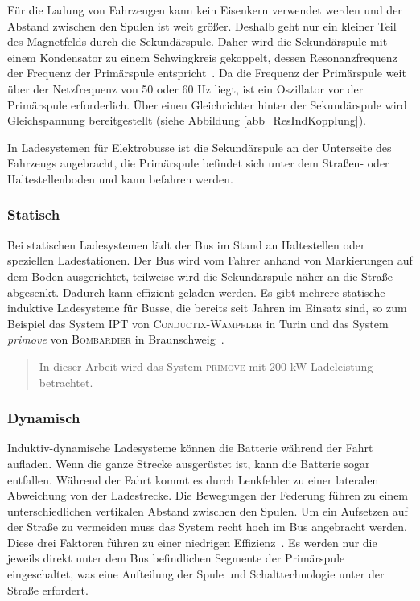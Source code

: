 Für die Ladung von Fahrzeugen kann kein Eisenkern verwendet werden und der Abstand zwischen den Spulen ist weit größer. Deshalb geht nur ein kleiner Teil des Magnetfelds durch die Sekundärspule. Daher wird die Sekundärspule mit einem Kondensator zu einem Schwingkreis gekoppelt, dessen Resonanzfrequenz der Frequenz der Primärspule entspricht~\cite{Kurs06072007}. Da die Frequenz der Primärspule weit über der Netzfrequenz von 50 oder 60 Hz liegt, ist ein Oszillator vor der Primärspule erforderlich. Über einen Gleichrichter hinter der Sekundärspule wird Gleichspannung bereitgestellt (siehe Abbildung \ref{abb_ResIndKopplung}).

In Ladesystemen für Elektrobusse ist die Sekundärspule an der Unterseite des Fahrzeugs angebracht, die Primärspule befindet sich unter dem Straßen- oder Haltestellenboden und kann befahren werden.

\subsubsection{Statisch}
Bei statischen Ladesystemen lädt der Bus im Stand an Haltestellen oder speziellen Ladestationen. Der Bus wird vom Fahrer anhand von Markierungen auf dem Boden ausgerichtet, teilweise wird die Sekundärspule näher an die Straße abgesenkt. Dadurch kann effizient geladen werden. Es gibt mehrere statische induktive Ladesysteme für Busse, die bereits seit Jahren im Einsatz sind, so zum Beispiel das System \textsc{IPT} von \textsc{Conductix-Wampfler} in Turin und das System \emph{primove} von \textsc{Bombardier} in Braunschweig~\cite{WeIPT}. 

\begin{quotation}
	In dieser Arbeit wird das System \textsc{primove} mit 200 kW Ladeleistung betrachtet.
\end{quotation}

\subsubsection{Dynamisch}
Induktiv-dynamische Ladesysteme können die Batterie während der Fahrt aufladen. Wenn die ganze Strecke ausgerüstet ist, kann die Batterie sogar entfallen. Während der Fahrt kommt es durch Lenkfehler zu einer lateralen Abweichung von der Ladestrecke. Die Bewegungen der Federung führen zu einem unterschiedlichen vertikalen Abstand zwischen den Spulen. Um ein Aufsetzen auf der Straße zu vermeiden muss das System recht hoch im Bus angebracht werden. Diese drei Faktoren führen zu einer niedrigen Effizienz~\cite{5618092}. Es werden nur die jeweils direkt unter dem Bus befindlichen Segmente der Primärspule eingeschaltet, was eine Aufteilung der Spule und Schalttechnologie unter der Straße erfordert.

